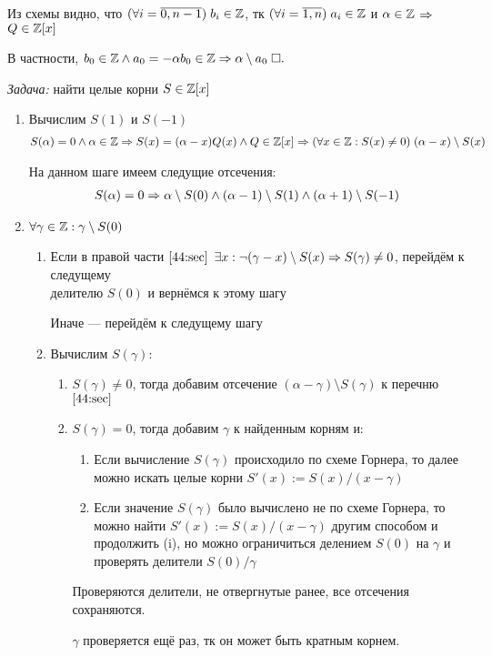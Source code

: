 \documentclass{article}
\begin{document}
Из схемы видно, что $(\forall i=\overline{0,n-1})\;b_i\in\mathbb{Z}$, тк $(\forall i=\overline{1,n})\;a_i\in\mathbb{Z}$ и $\alpha\in\mathbb{Z}$ $\Rightarrow$ $Q\in\mathbb{Z}[x]$

В частности, $b_0\in\mathbb{Z}\land a_0 = -\alpha b_0\in\mathbb{Z} \Rightarrow \alpha\setminus a_0\;\square.$


{\it Задача:} найти целые корни $S\in\mathbb{Z}[x]$

\begin{enumerate}
	\item{}Вычислим $S(1)$ и $S(-1)$
	\begin{align*}
		S(\alpha)=0\land\alpha\in\mathbb{Z}\Rightarrow S(x)=(\alpha-x)Q(x)\land Q\in\mathbb{Z}[x]\Rightarrow (\forall x\in\mathbb{Z}:S(x)\neq 0)\;(\alpha-x)\setminus S(x)
	\end{align*}

	На данном шаге имеем следущие отсечения:
	\begin{align}
		S(\alpha)=0\Rightarrow\alpha\setminus S(0)\land(\alpha-1)\setminus S(1)\land (\alpha+1)\setminus S(-1)\label{44:sec}
	\end{align}
	\item{}$\forall\gamma\in\mathbb{Z}:\gamma\setminus S(0)$
	\begin{enumerate}[label*=\arabic*.]
		\item{}Если в правой части $\eqref{44:sec}$ $\exists x:\lnot(\gamma-x)\setminus S(x)\Rightarrow S(\gamma)\neq 0$, перейдём к следущему\\
		делителю $S(0)$ и вернёмся к этому шагу

		Иначе --- перейдём к следущему шагу
		\item{}Вычислим $S(\gamma)$:
		\begin{enumerate}[label=(\alph*)]
			\item{}$S(\gamma)\neq 0$, тогда добавим отсечение $(\alpha-\gamma)\setminus S(\gamma)$ к перечню $\eqref{44:sec}$
			\item{}$S(\gamma)= 0$, тогда добавим $\gamma$ к найденным корням и:
			\begin{enumerate}[label=(\roman*)]
				\item{}Если вычисление $S(\gamma)$ происходило по схеме Горнера, то далее можно искать целые корни $S'(x):=S(x)/(x-\gamma)$

				\item{}Если значение $S(\gamma)$ было вычислено не по схеме Горнера, то можно найти $S'(x):=S(x)/(x-\gamma)$ другим способом и продолжить (i),
				но можно ограничиться делением $S(0)$ на $\gamma$ и проверять делители $S(0)/\gamma$
			\end{enumerate}

			Проверяются делители, не отвергнутые ранее, все отсечения сохраняются.

			$\gamma$ проверяется ещё раз, тк он может быть кратным корнем.

		\end{enumerate}
	\end{enumerate}
\end{enumerate}
\end{document}
